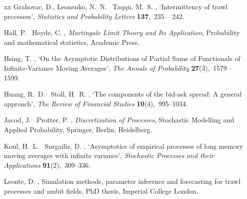 \documentclass{article}
\theoremstyle{plain}
\theoremstyle{definition}
\theoremstyle{remark}
\begin{document}
\begin{thebibliography}{xx}
Grahovac, D., Leonenko, N.~N. \harvardand\ Taqqu, M.~S.  \harvardyearright , `Intermittency of trawl processes', {\em Statistics and Probability Letters} {\bf 137},~235 -- 242.
\newline{}

Hall, P. \harvardand\ Heyde, C.  \harvardyearright , {\em Martingale Limit Theory and Its Application}, Probability and mathematical statistics, Academic Press.
\newline{}

Hsing, T.  \harvardyearright , `{On the Asymptotic Distributions of Partial Sums of Functionals of Infinite-Variance Moving Averages}', {\em The Annals of Probability} {\bf 27}(3),~1579 -- 1599.
\newline{}

Huang, R.~D. \harvardand\ Stoll, H.~R.  \harvardyearright , `The components of the bid-ask spread: A general approach', {\em The Review of Financial Studies} {\bf 10}(4),~995--1034.
\newline{}

Jacod, J. \harvardand\ Protter, P.  \harvardyearright , {\em Discretization of Processes}, Stochastic Modelling and Applied Probability, Springer, Berlin, Heidelberg.
\newline{}

Koul, H.~L. \harvardand\ Surgailis, D.  \harvardyearright , `Asymptotics of empirical processes of long memory moving averages with infinite variance', {\em Stochastic Processes and their Applications} {\bf 91}(2),~309--336.
\newline{}

Leonte, D.  \harvardyearright , Simulation methods, parameter inference and forecasting for trawl processes and ambit fields, PhD thesis, Imperial College London.


\end{thebibliography}
\end{document}
